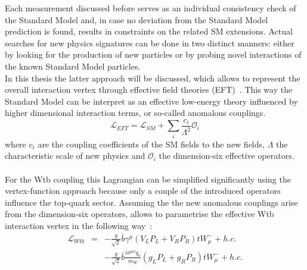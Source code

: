 Each measurement discussed before serves as an individual consistency check of the Standard Model and, in case no deviation from the Standard Model prediction is found, results in constraints on the related SM extensions.
Actual searches for new physics signatures can be done in two distinct manners: either by looking for the production of new particles or by probing novel interactions of the known Standard Model particles.
\\
In this thesis the latter approach will be discussed, which allows to represent the overall interaction vertex through effective field theories (EFT)~\cite{EFTOld}. This way the Standard Model can be interpret as an effective low-energy theory influenced by higher dimensional interaction terms, or so-called anomalous couplings.
\begin{equation}
 \mathcal{L}_{EFT} = \mathcal{L}_{SM} + \sum_{i} \frac{c_i}{\Lambda^{2}} \mathcal{O}_i
\end{equation}
where $c_i$ are the coupling coefficients of the SM fields to the new fields, $\Lambda$ the characteristic scale of new physics and $\mathcal{O}_i$ the dimension-six effective operators.
\\
\\
For the Wtb coupling this Lagrangian can be simplified significantly using the vertex-function approach because only a couple of the introduced operators influence the top-quark sector.
Assuming the the new anomalous couplings arise from the dimension-six operators, allows to parametrise the effective Wtb interaction vertex in the following way~\cite{EFTLinkWithWtb, RecentWtbZhang}:
\begin{eqnarray} \label{eq::FullWtbLagr}
  \mathcal{L}_{Wtb} & = & - \frac{g}{\sqrt{2}} \bar{b} \gamma^{\mu} \left( V_L P_L + V_R P_R \right) t W_{\mu}^{-} + h.c. \nonumber \\
		    &   & - \frac{g}{\sqrt{2}} \bar{b} \frac{i\sigma^{\mu \nu} q_{\nu}}{m_{W}} \left( g_L P_L + g_R P_R \right) t W_{\mu}^{-} + h.c.
\end{eqnarray}
